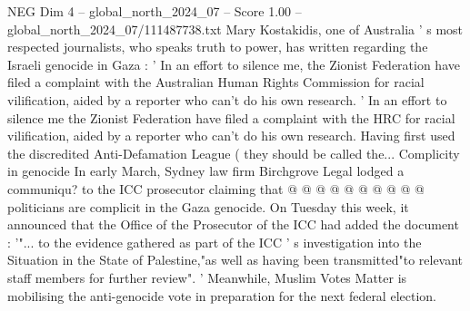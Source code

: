\begin{textsample}{NEG Dim 4 – global\_north\_2024\_07 – Score 1.00 – global\_north\_2024\_07/111487738.txt}
Mary Kostakidis, one of Australia ' s most respected journalists, who speaks truth to power, has written regarding the Israeli genocide in Gaza : ' In an effort to silence me, the Zionist Federation have filed a complaint with the Australian Human Rights Commission for racial vilification, aided by a reporter who can't do his own research. ' In an effort to silence me the Zionist Federation have filed a complaint with the HRC for racial vilification, aided by a reporter who can't do his own research.
Having first used the discredited Anti-Defamation League ( they should be called the...
Complicity in genocide In early March, Sydney law firm Birchgrove Legal lodged a communiqu? to the ICC prosecutor claiming that @ @ @ @ @ @ @ @ @ @ politicians are complicit in the Gaza genocide.
On Tuesday this week, it announced that the Office of the Prosecutor of the ICC had added the document : '"... to the evidence gathered as part of the ICC ' s investigation into the Situation in the State of Palestine,"as well as having been transmitted"to relevant staff members for further review". ' Meanwhile, Muslim Votes Matter is mobilising the anti-genocide vote in preparation for the next federal election.

\end{textsample}
